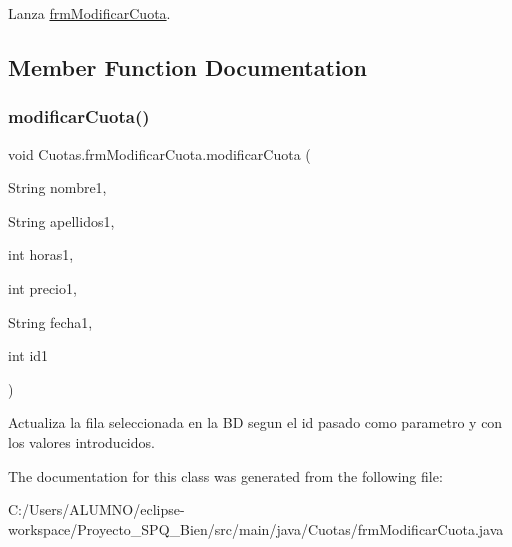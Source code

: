 Lanza \hyperlink{class_cuotas_1_1frm_modificar_cuota}{frm\+Modificar\+Cuota}. 

\subsection{Member Function Documentation}
\mbox{\label{class_cuotas_1_1frm_modificar_cuota_a2f53e2686e069b5a558086fb5e6893d9}} 
\subsubsection{\texorpdfstring{modificar\+Cuota()}{modificarCuota()}}
{\footnotesize\ttfamily void Cuotas.\+frm\+Modificar\+Cuota.\+modificar\+Cuota (\begin{DoxyParamCaption}\item[{String}]{nombre1,  }\item[{String}]{apellidos1,  }\item[{int}]{horas1,  }\item[{int}]{precio1,  }\item[{String}]{fecha1,  }\item[{int}]{id1 }\end{DoxyParamCaption})}

Actualiza la fila seleccionada en la BD segun el id pasado como parametro y con los valores introducidos. 

The documentation for this class was generated from the following file\+:\begin{DoxyCompactItemize}
\item 
C\+:/\+Users/\+A\+L\+U\+M\+N\+O/eclipse-\/workspace/\+Proyecto\+\_\+\+S\+P\+Q\+\_\+Bien/src/main/java/\+Cuotas/frm\+Modificar\+Cuota.\+java\end{DoxyCompactItemize}
